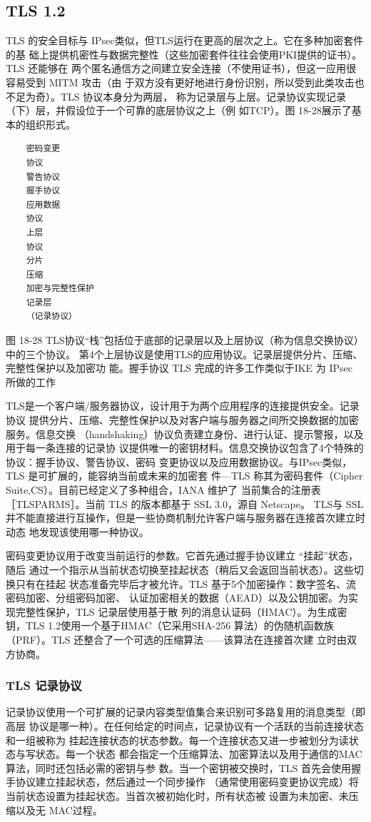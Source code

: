 \subsection{TLS 1.2}
TLS 的安全目标与 IPsec类似，但TLS运行在更高的层次之上。它在多种加密套件的基
础上提供机密性与数据完整性（这些加密套件往往会使用PKI提供的证书）。TLS 还能够在
两个匿名通信方之间建立安全连接（不使用证书），但这一应用很容易受到 MITM 攻击（由
于双方没有更好地进行身份识别，所以受到此类攻击也不足为奇）。TLS 协议本身分为两层，
称为记录层与上层。记录协议实现记录（下）层，并假设位于一个可靠的底层协议之上（例
如TCP）。图 18-28展示了基本的组织形式。
\begin{verbatim}
    密码变更
    协议
    警告协议
    握手协议
    应用数据
    协议
    上层
    协议
    分片
    压缩
    加密与完整性保护
    记录层
    （记录协议）
\end{verbatim}
图 18-28
TLS协议“栈”包括位于底部的记录层以及上层协议（称为信息交换协议）中的三个协议。
第4个上层协议是使用TLS的应用协议。记录层提供分片、压缩、完整性保护以及加密功
能。握手协议 TLS 完成的许多工作类似于IKE 为 IPsec 所做的工作

TLS是一个客户端/服务器协议，设计用于为两个应用程序的连接提供安全。记录协议
提供分片、压缩、完整性保护以及对客户端与服务器之间所交换数据的加密服务。信息交换
（handshaking）协议负责建立身份、进行认证、提示警报，以及用于每一条连接的记录协
议提供唯一的密钥材料。信息交换协议包含了4个特殊的协议：握手协议、警告协议、密码
变更协议以及应用数据协议。与IPsec类似，TLS 是可扩展的，能容纳当前或未来的加密套
件—TLS 称其为密码套件（Cipher Suite,CS）。目前已经定义了多种组合，IANA 维护了
当前集合的注册表［TLSPARMS］。当前 TLS 的版本都基于 SSL 3.0，源自 Netscape。 TLS与
SSL 并不能直接进行互操作，但是一些协商机制允许客户端与服务器在连接首次建立时动态
地发现该使用哪一种协议。

密码变更协议用于改变当前运行的参数。它首先通过握手协议建立 “挂起”状态，随后
通过一个指示从当前状态切换至挂起状态（稍后又会返回当前状态）。这些切换只有在挂起
状态准备完毕后才被允许。TLS 基于5个加密操作：数字签名、流密码加密、分组密码加密、
认证加密相关的数据（AEAD）以及公钥加密。为实现完整性保护，TLS 记录层使用基于散
列的消息认证码（HMAC）。为生成密钥，TLS 1.2使用一个基于HMAC（它采用SHA-256
算法）的伪随机函数族（PRF）。TLS 还整合了一个可选的压缩算法——该算法在连接首次建
立时由双方协商。

\subsubsection{TLS 记录协议}
记录协议使用一个可扩展的记录内容类型值集合来识别可多路复用的消息类型（即高层
协议是哪一种）。在任何给定的时间点，记录协议有一个活跃的当前连接状态和一组被称为
挂起连接状态的状态参数。每一个连接状态又进一步被划分为读状态与写状态。每一个状态
都会指定一个压缩算法、加密算法以及用于通信的MAC算法，同时还包括必需的密钥与参
数。当一个密钥被交换时，TLS 首先会使用握手协议建立挂起状态，然后通过一个同步操作
（通常使用密码变更协议完成）将当前状态设置为挂起状态。当首次被初始化时，所有状态被
设置为未加密、未压缩以及无 MAC过程。

